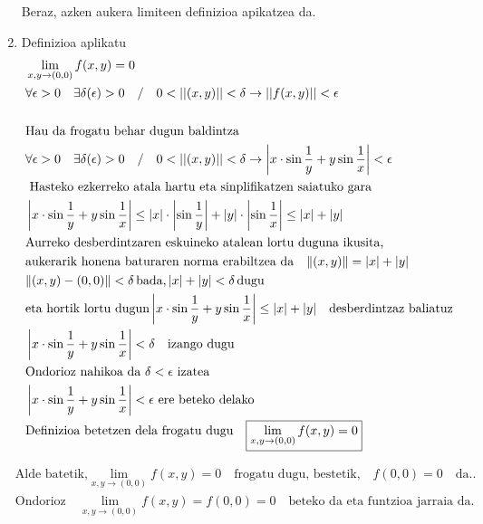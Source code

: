 \begin{enumerate}
    Beraz, azken aukera limiteen definizioa apikatzea da. 
    \item Definizioa aplikatu
    \begin{align*}
    &\lim_{x,y \to (0,0)}f(x,y)=0\\
    &\forall \epsilon >0 \quad \exists \delta(\epsilon)>0 \quad / \quad0<||(x,y)||<\delta \rightarrow ||f(x,y)||<\epsilon  \\
    \\
    &\text{Hau da frogatu behar dugun baldintza}\\
    &\forall \epsilon >0 \quad \exists \delta(\epsilon)>0 \quad / \quad0<||(x,y)||<\delta \rightarrow \left|x\cdot \sin \frac{1}{y}+ y \sin \frac{1}{x}\right|<\epsilon  \\
    &\text{ Hasteko ezkerreko atala hartu eta sinplifikatzen saiatuko gara}\\
    &\left|x\cdot \sin \frac{1}{y}+ y \sin \frac{1}{x}\right|\leq\left| x\right|\cdot\left |\sin\frac{1}{y}\right |+\left|y\right|\cdot\left|\sin\frac{1}{x}\right|\leq \abs{x}+\abs{y}\\
    &\text{Aurreko desberdintzaren eskuineko atalean lortu duguna ikusita,}\\
    &\text{aukerarik honena baturaren norma erabiltzea da} \quad \| (x,y) \| =\abs{x}+\abs{y}\ \\
    &\| (x,y)-(0,0) \| < \delta \, \text{bada,} \, | x | + | y | < \delta \, \text{dugu}\\
    &\text{eta hortik lortu dugun}\left|x\cdot \sin \frac{1}{y}+ y \sin \frac{1}{x}\right|\leq \abs{x}+\abs{y}\quad \text{desberdintzaz baliatuz}\\
    &\left|x\cdot \sin \frac{1}{y}+ y \sin \frac{1}{x}\right|< \delta\quad \text{izango dugu}\\
    &\text{Ondorioz nahikoa da } \delta < \epsilon \text{ izatea }\\
    &\left|x\cdot \sin \frac{1}{y}+ y \sin \frac{1}{x}\right| < \epsilon \ \text{ere beteko delako}\\
    &\text{Definizioa betetzen dela frogatu dugu} \quad \boxed{\lim_{x,y \to (0,0)}f(x,y)=0}
    \end{align*}
\end{enumerate}

\begin{align*}
    &\text{Alde batetik,}\lim_{x,y \to (0,0)}f(x,y)=0\quad \text{frogatu dugu, bestetik,}\quad f(0,0)=0 \quad \text{da.}.\\ &\text{Ondorioz} \quad \boxed{\lim_{x,y \to (0,0)}f(x,y)=f(0,0)=0} \quad \text{beteko da eta funtzioa jarraia da.}
\end{align*}



